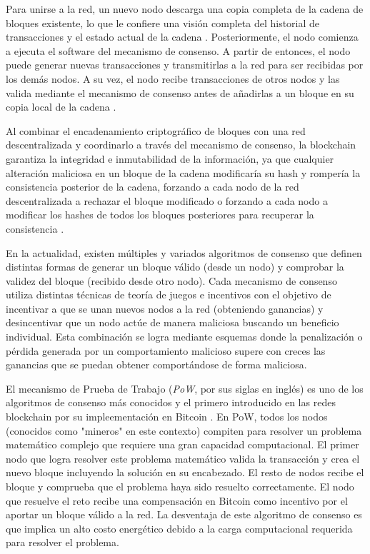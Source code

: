 Para unirse a la red, un nuevo nodo descarga una copia completa de la cadena de bloques existente, lo que le confiere una visión completa del historial de transacciones y el estado actual de la cadena \cite{bulkowska2023implementation}. Posteriormente, el nodo comienza a ejecuta el software del mecanismo de consenso. A partir de entonces, el nodo puede generar nuevas transacciones y transmitirlas a la red para ser recibidas por los demás nodos. A su vez, el nodo recibe transacciones de otros nodos y las valida mediante el mecanismo de consenso antes de añadirlas a un bloque en su copia local de la cadena \cite{bulkowska2023implementation}.

Al combinar el encadenamiento criptográfico de bloques con una red descentralizada y coordinarlo a través del mecanismo de consenso, la blockchain garantiza la integridad e inmutabilidad de la información, ya que cualquier alteración maliciosa en un bloque de la cadena modificaría su hash y rompería la consistencia posterior de la cadena, forzando a cada nodo de la red descentralizada a rechazar el bloque modificado o forzando a cada nodo a modificar los hashes de todos los bloques posteriores para recuperar la consistencia \cite{sunny2022systematic}.

En la actualidad, existen múltiples y variados algoritmos de consenso que definen distintas formas de generar un bloque válido (desde un nodo) y comprobar la validez del bloque (recibido desde otro nodo). Cada mecanismo de consenso utiliza distintas técnicas de teoría de juegos e incentivos con el objetivo de incentivar a que se unan nuevos nodos a la red (obteniendo ganancias) y desincentivar que un nodo actúe de manera maliciosa buscando un beneficio individual. Esta combinación se logra mediante esquemas donde la penalización o pérdida generada por un comportamiento malicioso supere con creces las ganancias que se puedan obtener comportándose de forma maliciosa.

El mecanismo de Prueba de Trabajo (\textit{PoW}, por sus siglas en inglés) es uno de los algoritmos de consenso más conocidos y el primero introducido en las redes blockchain por su impleementación en Bitcoin \cite{satoshi2008bitcoin}. En PoW, todos los nodos (conocidos como "mineros" en este contexto) compiten para resolver un problema matemático complejo que requiere una gran capacidad computacional. El primer nodo que logra resolver este problema matemático valida la transacción y crea el nuevo bloque incluyendo la solución en su encabezado. El resto de nodos recibe el bloque y comprueba que el problema haya sido resuelto correctamente. El nodo que resuelve el reto recibe una compensación en Bitcoin como incentivo por el aportar un bloque válido a la red. La desventaja de este algoritmo de consenso es que implica un alto costo energético debido a la carga computacional requerida para resolver el problema.

